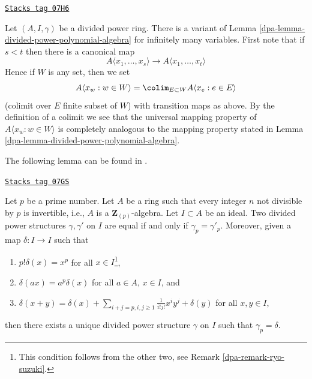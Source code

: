 \begin{remark}
\label{dpa-remark-divided-power-polynomial-algebra}
\href{https://stacks.math.columbia.edu/tag/07H6}{\texttt{Stacks tag 07H6}}

Let $(A, I, \gamma)$ be a divided power ring.
There is a variant of Lemma \ref{dpa-lemma-divided-power-polynomial-algebra}
for infinitely many variables. First note that if $s < t$ then there
is a canonical map
$$
A\langle x_1, \ldots, x_s \rangle \to A\langle x_1, \ldots, x_t\rangle
$$
Hence if $W$ is any set, then we set
$$
A\langle x_w: w \in W\rangle =
\colim_{E \subset W} A\langle x_e:e \in E\rangle
$$
(colimit over $E$ finite subset of $W$)
with transition maps as above. By the definition of a colimit we see
that the universal mapping property of $A\langle x_w: w \in W\rangle$ is
completely analogous to the mapping property stated in
Lemma \ref{dpa-lemma-divided-power-polynomial-algebra}.
\end{remark}

The following lemma can be found in \cite{BO}.

\begin{lemma}
\label{dpa-lemma-need-only-gamma-p}
\href{https://stacks.math.columbia.edu/tag/07GS}{\texttt{Stacks tag 07GS}}

Let $p$ be a prime number. Let $A$ be a ring such that every integer $n$
not divisible by $p$ is invertible, i.e., $A$ is a $\mathbf{Z}_{(p)}$-algebra.
Let $I \subset A$ be an ideal. Two divided power structures
$\gamma, \gamma'$ on $I$ are equal if and only if $\gamma_p = \gamma'_p$.
Moreover, given a map $\delta : I \to I$ such that
\begin{enumerate}
\item $p!\delta(x) = x^p$ for all $x \in I$\footnote{This condition
follows from the other two, see Remark \ref{dpa-remark-ryo-suzuki}.},
\item $\delta(ax) = a^p\delta(x)$ for all $a \in A$, $x \in I$, and
\item
$\delta(x + y) =
\delta(x) +
\sum\nolimits_{i + j = p, i,j \geq 1} \frac{1}{i!j!} x^i y^j +
\delta(y)$ for all $x, y \in I$,
\end{enumerate}
then there exists a unique divided power structure $\gamma$ on $I$ such
that $\gamma_p = \delta$.
\end{lemma}

